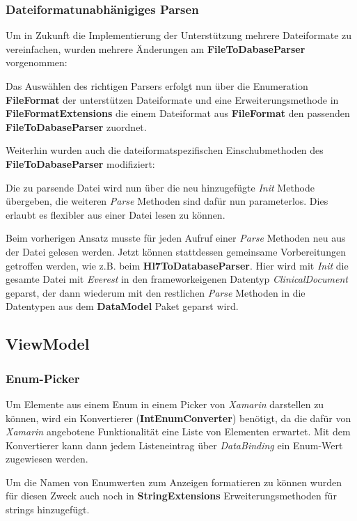 \documentclass[a4paper]{scrreprt}
\begin{document}
\subsubsection{Dateiformatunabhänigiges Parsen}
Um in Zukunft die Implementierung der Unterstützung mehrere Dateiformate zu vereinfachen, wurden mehrere Änderungen am \textbf{FileToDabaseParser} vorgenommen:

Das Auswählen des richtigen Parsers erfolgt nun über die Enumeration \textbf{FileFormat} der unterstützen Dateiformate und eine Erweiterungsmethode in \textbf{FileFormatExtensions} die einem Dateiformat aus \textbf{FileFormat} den passenden \textbf{FileToDabaseParser} zuordnet.

Weiterhin wurden auch die dateiformatspezifischen Einschubmethoden des \textbf{FileToDabaseParser} modifiziert: 

Die zu parsende Datei wird nun über die neu hinzugefügte \textit{Init} Methode übergeben, die weiteren \textit{Parse} Methoden sind dafür nun parameterlos. Dies erlaubt es flexibler aus einer Datei lesen zu können. 

Beim vorherigen Ansatz musste für jeden Aufruf einer \textit{Parse} Methoden neu aus der Datei gelesen werden. Jetzt können stattdessen gemeinsame Vorbereitungen getroffen werden, wie z.B. beim \textbf{Hl7ToDatabaseParser}. Hier wird mit \textit{Init} die gesamte Datei mit \textit{Everest} in den frameworkeigenen Datentyp \textit{ClinicalDocument} geparst, der dann wiederum mit den restlichen \textit{Parse} Methoden in die Datentypen aus dem \textbf{DataModel} Paket geparst wird.

\subsection{ViewModel}
\subsubsection{Enum-Picker}
Um Elemente aus einem Enum in einem Picker von \textit{Xamarin} darstellen zu können, wird ein Konvertierer (\textbf{IntEnumConverter}) benötigt, da die dafür von \textit{Xamarin} angebotene Funktionalität eine Liste von Elementen erwartet. Mit dem Konvertierer kann dann jedem Listeneintrag über \textit{DataBinding} ein Enum-Wert zugewiesen werden.

Um die Namen von Enumwerten zum Anzeigen formatieren zu können wurden für diesen Zweck auch noch in \textbf{StringExtensions} Erweiterungsmethoden für strings hinzugefügt.
\end{document}
